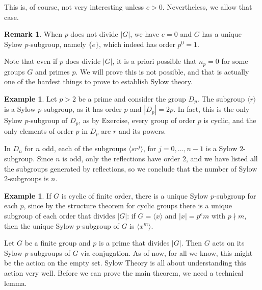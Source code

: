 \documentclass[12pt]{report}
\numberwithin{equation}{section}
\numberwithin{theorem}{chapter}
\theoremstyle{definition}
\newtheorem{example}[theorem]{Example}
\newtheorem*{basic properties}{Basic Properties}
\newtheorem*{Important Remark}{Important Remark}
\newtheorem{remark}[theorem]{Remark}
\begin{document}
This is, of course, not very interesting unless $e>0$. Nevertheless, we allow that case.

\begin{remark}\label{remark e Sylow}
When $p$ does not divide $|G|$, we have $e = 0$ and $G$ has a unique Sylow $p$-subgroup, namely $\{e\}$, which indeed has order $p^0=1$.
\end{remark}



Note that even if $p$ does divide $|G|$, it is a priori possible that $n_p = 0$ for some groups $G$ and primes $p$. We will prove this is not possible, and that is actually one of the hardest things to prove to establish Sylow theory. 

\begin{example} 
Let $p>2$ be a prime and consider the group $D_p$.
The subgroup $\langle r \rangle$ is a Sylow $p$-subgroup, as it has order $p$ and $|D_p|=2p$. In fact, this is the only Sylow $p$-subgroup of $D_{p}$, as by Exercise, every group of order $p$ is cyclic, and the only elements of order $p$ in $D_p$ are $r$ and its powers. %

In $D_{n}$ for $n$ odd, each of the subgroups $\langle sr^j \rangle$, for $j = 0, \dots, n-1$ is a Sylow $2$-subgroup. Since $n$ is odd, only the reflections have order $2$, and we have listed all the subgroups generated by reflections, so we conclude that the number of Sylow $2$-subgroups is $n$.	
\end{example}



\begin{example} 
If $G$ is cyclic of finite order, there is a unique Sylow $p$-subgroup for each $p$, since by the structure theorem for cyclic groups there is a unique subgroup of each order that divides $|G|$: if $G = \langle x \rangle$ and $|x| = p^e m$ with $p \nmid m$, then the unique Sylow $p$-subgroup of $G$ is $\langle x^m \rangle$.	
\end{example}





Let $G$ be a finite group and $p$ is a prime that divides $|G|$. Then $G$ acts on its Sylow $p$-subgroups of $G$ via conjugation. As of now, for all we know, this might be the action on the empty set. Sylow Theory is all about understanding this action very well. Before we can prove the main theorem, we need a technical lemma.
\end{document}
